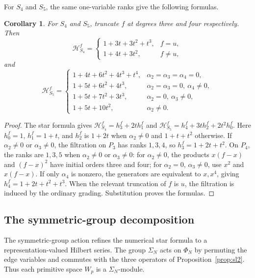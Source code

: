 \documentclass[reqno]{article}
\theoremstyle{plain} %
\newtheorem{corollary}[theorem]{Corollary}
\theoremstyle{definition}
\theoremstyle{remark}
\newcommand{\hs}{\mathscr{H}}
\numberwithin{equation}{section}
\begin{document}
For $S_4$ and $S_5$, the same one-variable ranks give the following
formulas.
\begin{corollary}\label{prop:star-small}
For $S_4$ and $S_5$, truncate $f$ at degrees three and four respectively.
Then
\begin{equation}\label{eq:star45}
 \hs_{S_4}^f=
 \begin{cases}
 1+3t+3t^2+t^3,&f=u,\\
 1+4t+3t^2,&f\ne u,
 \end{cases}
\end{equation}
and
\[
 \hs_{S_5}^f=
 \begin{cases}
 1+4t+6t^2+4t^3+t^4,&\alpha_2=\alpha_3=\alpha_4=0,\\
 1+5t+6t^2+4t^3,&\alpha_2=\alpha_3=0,\ \alpha_4\ne0,\\
 1+5t+7t^2+3t^3,&\alpha_2=0,\ \alpha_3\ne0,\\
 1+5t+10t^2,&\alpha_2\ne0.
 \end{cases}
\]
\end{corollary}
\begin{proof}
The star formula gives
$\hs_{S_4}^f=h_3^f+2t h_1^f$ and
$\hs_{S_5}^f=h_4^f+3t h_2^f+2t^2h_0^f$.
Here $h_0^f=1$, $h_1^f=1+t$, and $h_2^f$ is $1+2t$ when
$\alpha_2\ne0$ and $1+t+t^2$ otherwise.
If $\alpha_2\ne0$ or $\alpha_3\ne0$, the filtration on $P_3$ has
ranks $1,3,4$, so $h_3^f=1+2t+t^2$.
On $P_4$, the ranks are $1,3,5$ when $\alpha_2\ne0$ or
$\alpha_3\ne0$: for $\alpha_2\ne0$, the products $x(f-x)$ and
$(f-x)^2$ have initial orders three and four; for $\alpha_2=0$,
$\alpha_3\ne0$, use $x^2$ and $x(f-x)$.
If only $\alpha_4$ is nonzero, the generators are equivalent to
$x,x^4$, giving $h_4^f=1+2t+t^2+t^3$.
When the relevant truncation of $f$ is $u$, the filtration is induced
by the ordinary grading.
Substitution proves the formulas.
\end{proof}

\subsection{The symmetric-group decomposition}
\label{sec:star-symmetry}

The symmetric-group action refines the numerical star formula to a
representation-valued Hilbert series. The group $\Sigma_N$ acts
on $\Phi_N$ by permuting the edge variables and commutes with the
three operators of Proposition~\ref{prop:sl2}. Thus each primitive
space $W_p$ is a $\Sigma_N$-module.
\end{document}
